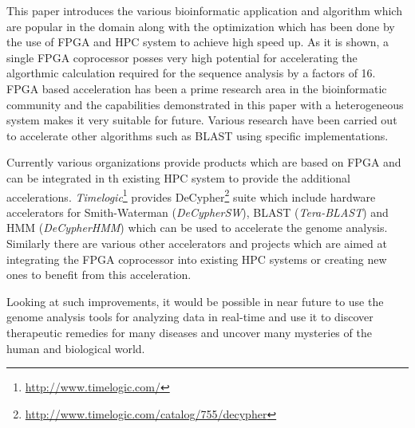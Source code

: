 \documentclass[12pt,twoside]{article}
\begin{document}
This paper introduces the various bioinformatic application and algorithm which are popular in the domain along with the optimization
which has been done by the use of FPGA and HPC system to achieve high speed up. As it is shown, a single FPGA coprocessor
posses very high potential for accelerating the algorthmic calculation required for the sequence analysis by a factors of 16. FPGA based 
acceleration has been a prime research area in the bioinformatic community and the capabilities demonstrated in this paper with a heterogeneous
system makes it very suitable for future. Various research have been carried out to accelerate other algorithms such as BLAST using
specific implementations.

Currently various organizations provide products which are based on FPGA and can be integrated in th existing HPC system to provide the additional accelerations.
\emph{Timelogic}\footnote{\url{http://www.timelogic.com/}} provides DeCypher\footnote{\url{http://www.timelogic.com/catalog/755/decypher}} suite which include
hardware accelerators for Smith-Waterman (\emph{DeCypherSW\texttrademark}), BLAST (\emph{Tera-BLAST\texttrademark}) and HMM (\emph{DeCypherHMM\texttrademark})
which can be used to accelerate the genome analysis. Similarly there are various other accelerators and projects which are aimed at integrating the FPGA coprocessor into existing HPC systems or creating new
ones to benefit from this acceleration.

Looking at such improvements, it would be possible in near future to use the genome analysis tools for analyzing data in real-time and use it to
discover therapeutic remedies for many diseases and uncover many mysteries of the human and biological world. 


\printbibliography
\end{document}
